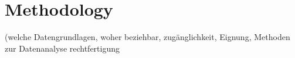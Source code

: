 \section{Methodology}
 (welche Datengrundlagen, woher beziehbar, zugänglichkeit, Eignung, Methoden zur Datenanalyse rechtfertigung